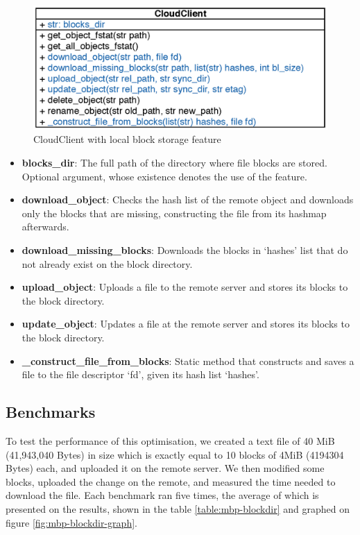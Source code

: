   \begin{figure}[!htpb]
    \centering
    \includegraphics{Images/CloudBlocks.eps}
    \caption{CloudClient with local block storage feature}
    \label{fig:cloud_block_uml}
  \end{figure}

   \begin{itemize}
    \item \textbf{blocks\_dir}: The full path of the directory where file blocks are stored. Optional argument, whose existence denotes the use of the feature.\\

    \item \textbf{download\_object}: Checks the hash list of the remote object and downloads only the blocks that are missing, constructing the file from its hashmap afterwards.
    \item \textbf{download\_missing\_blocks}: Downloads the blocks in `hashes' list that do not already exist on the block directory.
    \item \textbf{upload\_object}: Uploads a file to the remote server and stores its blocks to the block directory.
    \item \textbf{update\_object}: Updates a file at the remote server and stores its blocks to the block directory.
    \item \textbf{\_construct\_file\_from\_blocks}: Static method that constructs and saves a file to the file descriptor `fd', given its hash list `hashes'.
  \end{itemize}

  \subsection{Benchmarks}
  To test the performance of this optimisation, we created a text file of 40 MiB (41,943,040 Bytes) in size which is exactly equal to 10 blocks of 4MiB (4194304 Bytes) each, and uploaded it on the remote server. We then modified some blocks, uploaded the change on the remote, and measured the time needed to download the file. Each benchmark ran five times, the average of which is presented on the results, shown in the table \ref{table:mbp-blockdir} and graphed on figure \ref{fig:mbp-blockdir-graph}.\\

